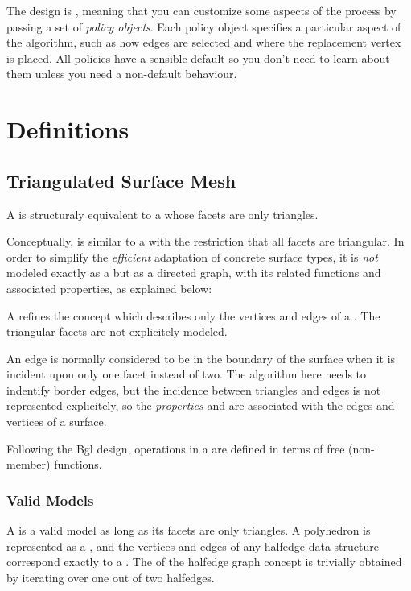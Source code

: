 The design is ,
meaning that you can customize some aspects of the process by passing a set of {\em policy objects}. Each policy object specifies a particular aspect of the algorithm, such as how edges are selected and where the replacement vertex is placed. All policies have a sensible default so you don't need to learn about them unless you need a non-default behaviour.

\section{Definitions\label{SurfaceMeshSimplification:SecDefinitions}}

\subsection{Triangulated Surface Mesh}

A  is structuraly equivalent to a  whose facets are only triangles.

Conceptually, is similar to a  with the restriction that all facets are triangular. In order to simplify the {\em efficient} adaptation of concrete surface types, it is {\em not} modeled exactly as a  but as a directed graph, with its related functions and associated properties, as explained below:

A  refines the  concept which describes only the vertices and edges of a . The triangular facets are not explicitely modeled. 

An edge is normally considered to be in the boundary of the surface when it is incident upon only one facet instead of two. The algorithm here needs to indentify border edges, but the incidence between triangles and edges is not represented explicitely, so the {\em properties}  and  are associated with the edges and vertices of a surface.

Following the {\sc Bgl} design, operations in a  are defined in terms of free (non-member) functions.

\subsubsection{Valid Models}

A  is a valid  model as long as its facets are only triangles. A polyhedron is represented as a , and the vertices and edges of any halfedge data structure correspond exactly to a . The  of the halfedge graph concept is trivially obtained by iterating over one out of two halfedges.

